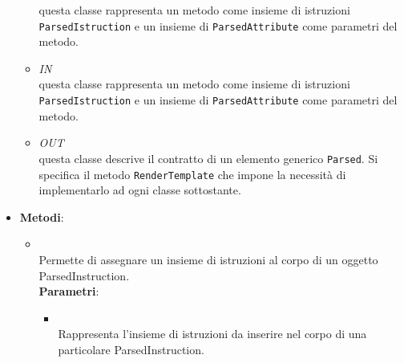 \begin{itemize}
\begin{itemize}
questa classe rappresenta un metodo come insieme di istruzioni \texttt{ParsedIstruction} e un insieme di \texttt{ParsedAttribute} come parametri del metodo.
\item \textit{IN} \hyperref[\nogloxy{swedesigner::server::project::ParsedMethod}]{}\\
questa classe rappresenta un metodo come insieme di istruzioni \texttt{ParsedIstruction} e un insieme di \texttt{ParsedAttribute} come parametri del metodo.
\item \textit{OUT} \hyperref[\nogloxy{swedesigner::server::project::ParsedElement}]{}\\
questa classe descrive il contratto di un elemento generico \texttt{Parsed}. Si specifica il metodo \texttt{RenderTemplate} che impone la necessità di implementarlo ad ogni classe sottostante.
\end{itemize}
\item \textbf{Metodi}:
\begin{itemize}
\item {}
\\ Permette di assegnare un insieme di istruzioni al corpo di un oggetto ParsedInstruction.
\\ \textbf{Parametri}:
\begin{itemize}
\item {}
\\ Rappresenta l'insieme di istruzioni da inserire nel corpo di una particolare ParsedInstruction.
\end{itemize}
\end{itemize}
\end{itemize}

